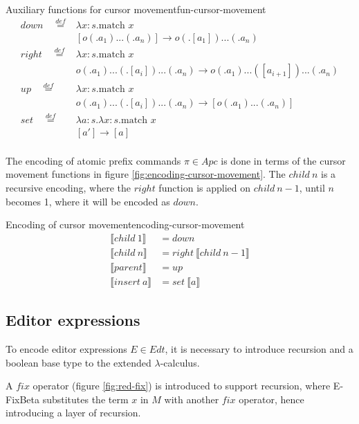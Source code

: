 \documentclass{article}
\begin{document}
\begin{myfigure}{Auxiliary functions for cursor movement}{fun-cursor-movement}
\[
\begin{aligned}
down \quad \stackrel{def}{=}&
\lambda x : s.\text{match } x\\
&[o (.a_1)...(.a_n)] \rightarrow o(.[a_1])...(.a_n)\\
right \quad \stackrel{def}{=}&
\lambda x : s.\text{match } x\\
&o (.a_1)...(.[a_i])...(.a_n) \rightarrow o(.a_1)...([a_{i+1}])...(.a_n)\\
up \quad \stackrel{def}{=}&
\lambda x : s.\text{match } x\\
&o (.a_1)...(.[a_i])...(.a_n) \rightarrow [o(.a_1)...(.a_n)]\\
set \quad \stackrel{def}{=}&
\lambda a : s.\lambda x : s.\text{match } x\\
&[a'] \rightarrow [a]\\
\end{aligned}
\]
\end{myfigure}

The encoding of atomic prefix commands $\pi \in Apc$ is done in terms of the cursor movement functions in figure \ref{fig:encoding-cursor-movement}. The $child \ n$ is a recursive encoding, where the $right$ function is applied on $child \ n - 1$, until $n$ becomes 1, where it will be encoded as $down$.

\begin{myfigure}{Encoding of cursor movement}{encoding-cursor-movement}
\[
\begin{aligned}
\llbracket child \ 1 \rrbracket &= down\\
\llbracket child \ n \rrbracket &= right \ \llbracket child \ n - 1 \rrbracket\\
\llbracket parent \rrbracket &= up\\
\llbracket insert \ a \rrbracket &= set \ \llbracket a \rrbracket
\end{aligned}
\]
\end{myfigure}

\subsection{Editor expressions}
To encode editor expressions $E \in Edt$, it is necessary to introduce recursion and a boolean base type to the extended $\lambda$-calculus.

A $fix$ operator (figure \ref{fig:red-fix}) is introduced to support recursion, where E-FixBeta substitutes the term $x$ in $M$ with another $fix$ operator, hence introducing a layer of recursion.
\end{document}
